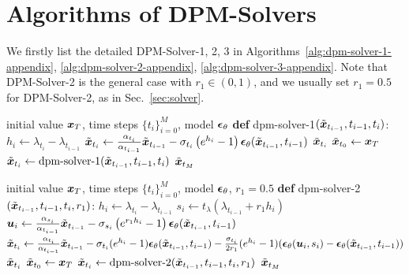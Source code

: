 \section{Algorithms of DPM-Solvers}
\label{appendix:algorithm}
We firstly list the detailed DPM-Solver-1, 2, 3 in Algorithms~\ref{alg:dpm-solver-1-appendix}, \ref{alg:dpm-solver-2-appendix}, \ref{alg:dpm-solver-3-appendix}. Note that DPM-Solver-2 is the general case with $r_1\in(0,1)$, and we usually set $r_1=0.5$ for DPM-Solver-2, as in Sec.~\ref{sec:solver}.

\begin{algorithm}[htbp]
    \centering
    \caption{DPM-Solver-1.}\label{alg:dpm-solver-1-appendix}
    \begin{algorithmic}[1]
    \Require initial value $\bm{x}_T$, time steps $\{t_i\}_{i=0}^M$, model $\bm{\epsilon}_\theta$
        \State \textbf{def} dpm-solver-1$(\tilde{\bm{x}}_{t_{i-1}}, t_{i-1}, t_i)$:
            \State\quad $h_i \gets \lambda_{t_{i}} - \lambda_{t_{i-1}}$
            \State\quad $\tilde{\bm{x}}_{t_i} \gets \frac{\alpha_{t_i}}{\alpha_{t_{i-1}}} \tilde{\bm{x}}_{t_{i-1}} - \sigma_{t_i}\left(e^{h_i} - 1\right)\bm{\epsilon}_\theta(\tilde {\bm{x}}_{t_{i-1}},t_{i-1})$
            \State\quad \Return $\tilde{\bm{x}}_{t_i}$
        \State $\tilde{\bm{x}}_{t_0}\gets\bm{x}_T$
        \State $\tilde{\bm{x}}_{t_i} \gets \text{dpm-solver-1}(\tilde{\bm{x}}_{t_{i-1}}, t_{i-1}, t_i)$
        \EndFor
    \State \Return $\tilde{\bm{x}}_{t_M}$
    \end{algorithmic}
\end{algorithm}

\begin{algorithm}[htbp]
    \centering
    \caption{DPM-Solver-2 (general version).}\label{alg:dpm-solver-2-appendix}
    \begin{algorithmic}[1]
    \Require initial value $\bm{x}_T$, time steps $\{t_i\}_{i=0}^M$, model $\bm{\epsilon}_\theta$, $r_1=0.5$
        \State \textbf{def} dpm-solver-2$(\tilde{\bm{x}}_{t_{i-1}}, t_{i-1}, t_i, r_1)$:
            \State\quad $h_i \gets \lambda_{t_{i}} - \lambda_{t_{i-1}}$
            \State\quad $s_{i} \gets t_{\lambda}\left(\lambda_{t_{i-1}} + r_1 h_i\right)$
            \State\quad $\bm{u}_{i} \gets \frac{\alpha_{s_i}}{\alpha_{t_{i-1}}} \tilde{\bm{x}}_{t_{i-1}} - \sigma_{s_i}\left(e^{r_1 h_i} - 1\right)\bm{\epsilon}_\theta(\tilde {\bm{x}}_{t_{i-1}},t_{i-1})$
            \State\quad $\tilde{\bm{x}}_{t_{i}} \gets \frac{\alpha_{t_{i}}}{\alpha_{t_{i-1}}} \tilde{\bm{x}}_{t_{i-1}} - \sigma_{t_{i}}(e^{h_i} - 1)\bm{\epsilon}_\theta(\tilde{\bm{x}}_{t_{i-1}},t_{i-1}) - \frac{\sigma_{t_{i}}}{2r_1}(e^{h_i} - 1)(\bm{\epsilon}_\theta(\bm{u}_{i},s_i) - \bm{\epsilon}_\theta(\tilde{\bm{x}}_{t_{i-1}}, t_{i-1}))$
            \State\quad \Return $\tilde{\bm{x}}_{t_i}$
        \State $\tilde{\bm{x}}_{t_0}\gets\bm{x}_T$
        \State $\tilde{\bm{x}}_{t_i} \gets \text{dpm-solver-2}(\tilde{\bm{x}}_{t_{i-1}}, t_{i-1}, t_i, r_1)$
        \EndFor
    \State \Return $\tilde{\bm{x}}_{t_M}$
    \end{algorithmic}
\end{algorithm}

